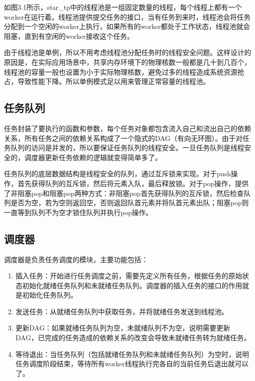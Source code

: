 如图3.1所示，star\_tp中的线程池是一组固定数量的线程，每个线程上都有一个worker在运行着。线程池提供提交任务的接口，当有任务到来时，线程池会将任务分配到一个空闲的worker上执行，如果所有的worker都处于工作状态，线程池就会阻塞，直到有空闲的worker接收这个任务。

由于线程池是单例，所以不用考虑线程池分配任务时的线程安全问题。这样设计的原因是，在实际应用场景中，共享内存环境下的物理核数一般都是几十到几百个，线程池的容量一般也设置为小于实际物理核数，避免过多的线程造成系统资源抢占，导致性能下降。所以单例模式足以用来管理正常容量的线程池。

\subsection{任务队列}

任务封装了要执行的函数和参数，每个任务对象都包含流入自己和流出自己的依赖关系，所有任务之间的依赖关系构成了一个隐式的DAG（有向无环图）。由于对任务队列的访问是并发的，所以要保证任务队列的线程安全。一旦任务队列是线程安全的，调度器更新任务依赖的逻辑就变得简单多了。

任务队列的底层数据结构是线程安全的队列，通过互斥锁来实现。对于push操作，首先获得队列的互斥锁，然后将元素入队，最后释放锁。对于pop操作，提供了非阻塞pop和阻塞pop两种方式：非阻塞pop首先获得队列的互斥锁，然后检查队列是否为空，若为空则返回空，否则返回队首元素并将队首元素出队；阻塞pop则一直等到队列不为空才锁住队列并执行pop操作。

\subsection{调度器}

调度器是负责任务调度的模块，主要功能包括：

\begin{enumerate}
	\item 插入任务：开始进行任务调度之前，需要先定义所有任务，根据任务的原始状态初始化就绪任务队列和未就绪任务队列。调度器的插入任务的接口的作用就是初始化任务队列。
	\item 发送任务：从就绪任务队列中获取任务，并将就绪任务发送到线程池。
	\item 更新DAG：如果就绪任务队列为空，未就绪队列不为空，说明需要更新DAG，已完成的任务造成的依赖关系的改变会导致未就绪任务转为就绪任务。
	\item 等待退出：当任务队列（包括就绪任务队列和未就绪任务队列）为空时，说明任务调度阶段结束，等待所有worker线程执行完各自的当前任务后退出就可以了。
\end{enumerate}

